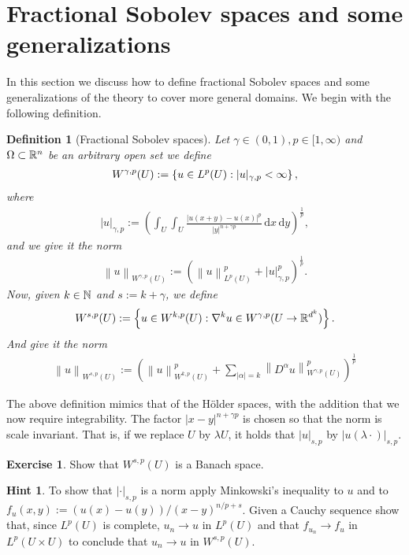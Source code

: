 \documentclass[12pt]{article}
\newtheorem{definition}[theorem]{Definition}
\theoremstyle{definition}
\newtheorem{exercise}{Exercise}
\newtheorem*{hint}{Hint}
\renewcommand{\norm}[1]{\left\lVert #1 \right\rVert}\renewcommand{\abs}[1]{\left| #1 \right|}
\renewcommand{\d}{\,\mathrm{d}}
\begin{document}
\section{Fractional Sobolev spaces and  some generalizations}
In this section we discuss how to define fractional Sobolev spaces and some generalizations of the theory to cover more general domains. We begin with the following definition.
\begin{definition}[Fractional Sobolev spaces]
	Let $\gamma  \in (0,1), p \in [1,\infty)$ and $\Omega  \subset \mathbb{R}^n$ be an arbitrary open set we define
	\begin{align*}
		W^{\gamma  ,p}(U):= \left\{u \in L^p(U): | u |_{\gamma,p}<\infty\right\},
	\end{align*}
	where
	\begin{align}\label{fractional seminorm}
		| u |_{\gamma  ,p}:= \left(\int_{U}\int_{U}\frac{\abs{u(x+y)-u(x)}^p}{\abs{y}^{n+\gamma p}}\d x \d y\right)^{\frac{1}{p}},
	\end{align}
	and we give it the norm
	\begin{align*}
		\norm{u}_{W^{\gamma,p}(U)}:= \left(\norm{u}_{L^p(U)}^p+| u |_{\gamma ,p}^p\right)^{\frac{1}{p}}.
	\end{align*}
	Now, given $k \in \mathbb{N}$ and $s:=k+\gamma $, we define
	\begin{align*}
		W^{s ,p}(U):= \left\{u \in W^{k ,p}(U): \nabla^k  u \in W^{\gamma ,p}(U \to \mathbb{R}^{d^k})\right\}.
	\end{align*}
	And give it the norm
	\begin{align}\label{norm def}
		\norm{u}_{W^{s,p}(U)}:= \left(\norm{u}_{W^{k,p}(U)}^p+ \sum_{\abs{\alpha}=k }\norm{D^\alpha u}_{W^{\gamma ,p}(U)}^p\right)^\frac{1}{p}
	\end{align}
\end{definition}
The above definition mimics that of the H\"older spaces, with the addition that we now require integrability. The factor $\abs{x-y}^{n+\gamma p}$ is chosen so that the norm is scale invariant. That is, if we replace $U$ by $\lambda U$, it holds that $|u|_{s,p}$ by $|u(\lambda \cdot )|_{s,p}$.
\begin{exercise}
	Show that $W^{s,p}(U)$ is a Banach space.
\end{exercise}
\begin{hint}
	To show that $| \cdot |_{s,p}$ is a norm apply Minkowski's inequality to $u$ and to $f_u(x,y):=(u(x)-u(y))/(x-y)^{n/p+s}$. Given a Cauchy sequence show that, since $L^p(U)$ is complete, $u_n \to u$ in $L^p(U)$ and that $f_{u_n} \to f_u$ in $L^p(U\times U)$ to conclude that $u_n \to u$ in $W^{s,p}(U)$.
\end{hint}
\end{document}
